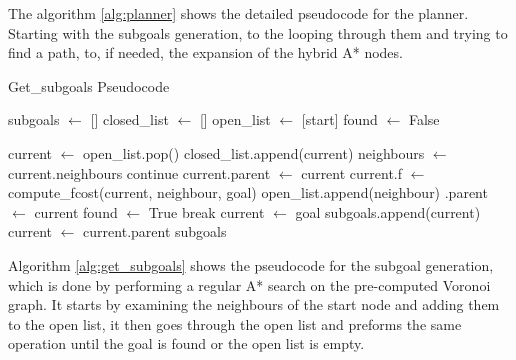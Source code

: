 The algorithm \ref{alg:planner} shows the detailed pseudocode for the planner. Starting 
with the subgoals generation, to the looping through them and trying to find a path, 
to, if needed, the expansion of the hybrid A* nodes.
\begin{algorithm}[h]
\caption{Get\_subgoals Pseudocode}
\label{alg:get_subgoals}
\begin{algorithmic}[1]
    \State subgoals $\gets$ []
    \State closed\_list $\gets$ []
    \State open\_list $\gets$ [start]
    \State found $\gets$ False

        \State current $\gets$ open\_list.pop()
        \State closed\_list.append(current)
        \State neighbours $\gets$ current.neighbours
                        \State continue
                    \EndIf
                \EndIf
                \State current.parent $\gets$ current
                \State current.f $\gets$ compute\_fcost(current, neighbour, goal)
                \State open\_list.append(neighbour)
            \EndIf
                \Stategoal.parent $\gets$ current
                \State found $\gets$ True
                break
            \EndIf
        \EndFor
    \EndWhile
        \State current $\gets$ goal
            \State subgoals.append(current)
            \State current $\gets$ current.parent
        \EndWhile
    \EndIf
    \State \Return subgoals
\EndFunction
\end{algorithmic}
\end{algorithm}

Algorithm \ref{alg:get_subgoals} shows the pseudocode for the subgoal generation, 
which is done by performing a regular A* search on the pre-computed Voronoi graph. 
It starts by examining the neighbours of the start node and adding them 
to the open list, it then goes through the open list and preforms the 
same operation until the goal is found or the open list is empty.

